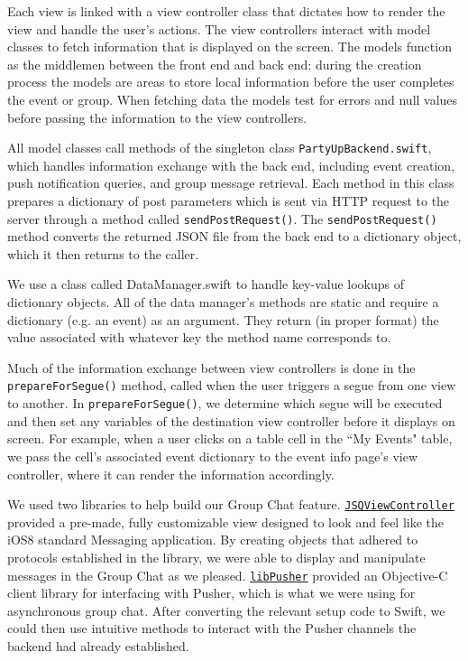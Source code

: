 \documentclass[12pt]{article}
\begin{document}
Each view is linked with a view controller class
that dictates how to render the view and handle the user's actions. 
The view controllers interact with model classes to fetch information 
that is displayed on the screen. 
The models function as the middlemen between the front end and back end: 
during the creation process the models are areas to store local information 
before the user completes the event or group. When fetching data the models 
test for errors and null values before passing the information to the view controllers.

All model classes call methods of the singleton class \texttt{PartyUpBackend.swift},
which handles information exchange with the back end, including event creation,
push notification queries, and group message retrieval.
Each method in this class prepares a dictionary of post parameters which is
sent via HTTP request to the server through a method called \texttt{sendPostRequest()}.
The \texttt{sendPostRequest()} method converts the returned JSON file from the back end to a dictionary object,
which it then returns to the caller.

We use a class called DataManager.swift to handle key-value lookups of dictionary objects.
All of the data manager's methods are static and require a dictionary (e.g. an event) as an argument.
They return (in proper format) the value associated with whatever key the method name corresponds to. 

Much of the information exchange between view controllers is done in the \texttt{prepareForSegue()} method,
called when the user triggers a segue from one view to another. In \texttt{prepareForSegue()},
we determine which segue will be executed and then set any variables of the destination view
controller before it displays on screen.
For example, when a user clicks on a table cell in the ``My Events" table,
we pass the cell's associated event dictionary to the event info page's view controller,
where it can render the information accordingly. 

We used two libraries to help build our Group Chat feature.
\href{https://github.com/jessesquires/JSQMessagesViewController}{\texttt{JSQViewController}} 
provided a pre-made, fully customizable view designed to look and feel like the iOS8 standard
Messaging application.
By creating objects that adhered to protocols established in the library, we were able to display
and manipulate messages in the Group Chat as we pleased.
\href{https://github.com/lukeredpath/libPusher}{\texttt{libPusher}} provided an Objective-C
client library for interfacing with Pusher, which is what we were using for asynchronous group
chat. After converting the relevant setup code to Swift, we could then use intuitive methods to
interact with the Pusher channels the backend had already established.
\end{document}
